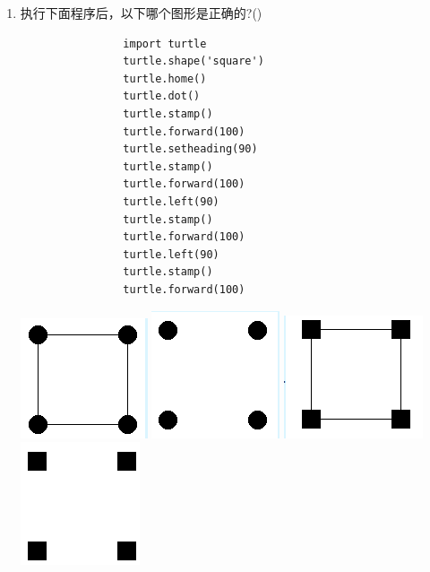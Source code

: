 \documentclass[11pt]{ctexart}
\begin{document}
\begin{enumerate}
        \item 执行下面程序后，以下哪个图形是正确的?(\qquad)
        
        \begin{minipage}{.53\textwidth}
            \begin{lstlisting}
                import turtle
                turtle.shape('square')
                turtle.home()
                turtle.dot()
                turtle.stamp()
                turtle.forward(100)
                turtle.setheading(90)
                turtle.stamp()
                turtle.forward(100)
                turtle.left(90)
                turtle.stamp()
                turtle.forward(100)
                turtle.left(90)
                turtle.stamp()
                turtle.forward(100)
            \end{lstlisting}
        \end{minipage}
        \begin{minipage}{.4\textwidth}
            \begin{tasks}
                \task \includegraphics[width=.2\textwidth]{23a.png}
                \task \includegraphics[width=.2\textwidth]{23b.png}
                \task \includegraphics[width=.2\textwidth]{23c.png}
                \task \includegraphics[width=.2\textwidth]{23d.png}
            \end{tasks}
        \end{minipage}   


\end{enumerate}
\end{document}
